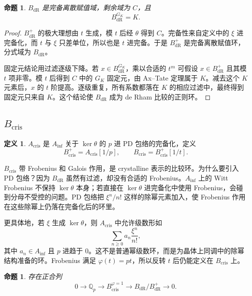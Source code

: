 \documentclass[11pt,a4paper,openany]{ctexbook}
\numberwithin{equation}{chapter}
\newcommand{\Q}{\mathbb{Q}}
\theoremstyle{plain}
\newtheorem{proposition}[theorem]{命题}
\theoremstyle{definition}
\newtheorem{definition}[theorem]{定义}
\theoremstyle{remark}
\begin{document}
\begin{proposition}
$B_{\mathrm{dR}}$ 是完备离散赋值域，剩余域为 $C$，且
\[
  B_{\mathrm{dR}}^{G_K}=K.
\]
\end{proposition}

\begin{proof}
$B_{\mathrm{dR}}^+$ 的极大理想由 $t$ 生成，模 $t$ 后经 $\theta$ 得到 $C$。完备性来自定义中的 $\xi$ 进完备化，而 $t$ 与 $\xi$ 只差单位，所以也是 $t$ 进完备。于是 $B_{\mathrm{dR}}^+$ 是完备离散赋值环，分式域为 $B_{\mathrm{dR}}$。

固定元结论用过滤逐级下降。若 $x\in B_{\mathrm{dR}}^{G_K}$，乘以合适的 $t^m$ 可假设 $x\in B_{\mathrm{dR}}^+$ 且其模 $t$ 项非零。模 $t$ 后得到 $C$ 中的 $G_K$ 固定元，由 Ax--Tate 定理属于 $K$。减去这个 $K$ 元素后，$x$ 的 $t$ 阶提高。逐级重复，所有系数都落在 $K$ 的相应过滤中，最终得到固定元只来自 $K$。这个结论使 $B_{\mathrm{dR}}$ 成为 de Rham 比较的正则环。
\end{proof}

\subsection{\texorpdfstring{$B_{\mathrm{cris}}$}{Bcris}}

\begin{definition}
$A_{\mathrm{cris}}$ 是 $A_{\inf}$ 关于 $\ker\theta$ 的 $p$ 进 PD 包络的完备化，定义
\[
  B_{\mathrm{cris}}^+=A_{\mathrm{cris}}[1/p],\qquad
  B_{\mathrm{cris}}=B_{\mathrm{cris}}^+[1/t].
\]
\end{definition}

$B_{\mathrm{cris}}$ 带 Frobenius 和 Galois 作用，是 crystalline 表示的比较环。为什么要引入 PD 包络？因为 $B_{\mathrm{dR}}$ 虽然有过滤，却没有合适的 Frobenius。$A_{\inf}$ 上的 Witt Frobenius 不保持 $\ker\theta$ 本身；若直接在 $\ker\theta$ 进完备化中使用 Frobenius，会碰到分母不受控的问题。PD 包络把 $\xi^n/n!$ 这样的除幂元素加入，使 Frobenius 作用在这些除幂上仍落在完备化后的环里。

更具体地，若 $\xi$ 生成 $\ker\theta$，则 $A_{\mathrm{cris}}$ 中允许级数形如
\[
  \sum_{n\ge0}a_n\frac{\xi^n}{n!},
\]
其中 $a_n\in A_{\inf}$ 且 $p$ 进趋于 $0$。这不是普通幂级数环，而是为晶体上同调中的除幂结构准备的环。Frobenius 满足 $\varphi(t)=pt$，所以反转 $t$ 后仍能定义在 $B_{\mathrm{cris}}$ 上。

\begin{proposition}
存在正合列
\[
  0\to\Q_p\to B_{\mathrm{cris}}^{\varphi=1}\to B_{\mathrm{dR}}/B_{\mathrm{dR}}^+\to0.
\]
\end{proposition}
\end{document}
